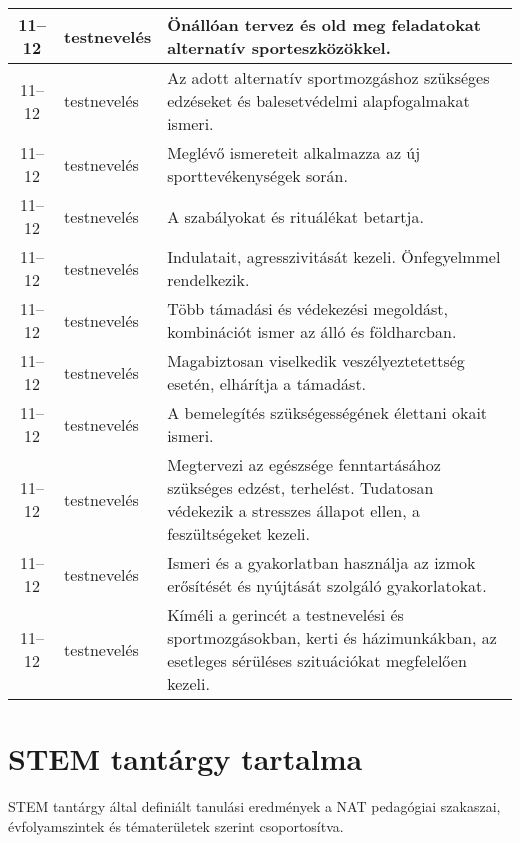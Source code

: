 \begin{small}
\begin{longtable}{c | p{2cm} |  p{11cm} }
              11--12 & testnevelés & Önállóan tervez  és old meg feladatokat alternatív sporteszközökkel. \\ \hline
              11--12 & testnevelés & Az adott alternatív sportmozgáshoz szükséges edzéseket és balesetvédelmi alapfogalmakat ismeri. \\ \hline
              11--12 & testnevelés & Meglévő ismereteit alkalmazza az új sporttevékenységek során. \\ \hline
              11--12 & testnevelés & A szabályokat és rituálékat betartja. \\ \hline
              11--12 & testnevelés & Indulatait, agresszivitását kezeli. Önfegyelmmel rendelkezik. \\ \hline
              11--12 & testnevelés & Több támadási és védekezési megoldást, kombinációt ismer az álló és földharcban. \\ \hline
              11--12 & testnevelés & Magabiztosan viselkedik veszélyeztetettség esetén, elhárítja a támadást. \\ \hline
              11--12 & testnevelés & A bemelegítés szükségességének élettani okait ismeri. \\ \hline
              11--12 & testnevelés & Megtervezi az egészsége fenntartásához szükséges edzést, terhelést. Tudatosan védekezik a stresszes állapot ellen, a feszültségeket kezeli. \\ \hline
              11--12 & testnevelés & Ismeri és a gyakorlatban használja az izmok erősítését és nyújtását szolgáló gyakorlatokat. \\ \hline
              11--12 & testnevelés & Kíméli a gerincét a testnevelési és sportmozgásokban, kerti és házimunkákban, az esetleges sérüléses szituációkat megfelelően kezeli. \\ \hline
      \end{longtable}
\end{small}




\section{STEM tantárgy tartalma }
STEM tantárgy által definiált tanulási eredmények a NAT pedagógiai szakaszai, évfolyamszintek és tématerületek szerint csoportosítva.

